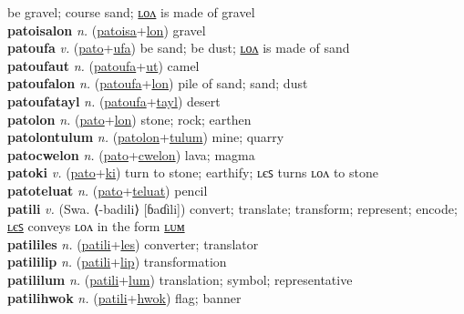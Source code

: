 be gravel; course sand; \hyperref[patoisalon]{ʟᴏᴧ} is made of gravel \label{patoisa} \\
\textbf{patoisalon} \textit{n.} (\hyperref[patoisa]{patoisa}+\hyperref[lon]{lon})
gravel \label{patoisalon} \\
\textbf{patoufa} \textit{v.} (\hyperref[pato]{pato}+\hyperref[ufa]{ufa})
be sand; be dust; \hyperref[patoufalon]{ʟᴏᴧ} is made of sand \label{patoufa} \\
\textbf{patoufaut} \textit{n.} (\hyperref[patoufa]{patoufa}+\hyperref[ut]{ut})
camel \label{patoufaut} \\
\textbf{patoufalon} \textit{n.} (\hyperref[patoufa]{patoufa}+\hyperref[lon]{lon})
pile of sand; sand; dust \label{patoufalon} \\
\textbf{patoufatayl} \textit{n.} (\hyperref[patoufa]{patoufa}+\hyperref[tayl]{tayl})
desert \label{patoufatayl} \\
\textbf{patolon} \textit{n.} (\hyperref[pato]{pato}+\hyperref[lon]{lon})
stone; rock; earthen \label{patolon} \\
\textbf{patolontulum} \textit{n.} (\hyperref[patolon]{patolon}+\hyperref[tulum]{tulum})
mine; quarry \label{patolontulum} \\
\textbf{patocwelon} \textit{n.} (\hyperref[pato]{pato}+\hyperref[cwelon]{cwelon})
lava; magma \label{patocwelon} \\
\textbf{patoki} \textit{v.} (\hyperref[pato]{pato}+\hyperref[ki]{ki})
turn to stone; earthify; ʟєꜱ turns ʟᴏᴧ to stone \label{patoki} \\
\textbf{patoteluat} \textit{n.} (\hyperref[pato]{pato}+\hyperref[teluat]{teluat})
pencil \label{patoteluat} \\
\textbf{patili} \textit{v.} (Swa. ⟨-badili⟩ [ɓaɗili])
convert; translate; transform; represent; encode; \hyperref[patililes]{ʟєꜱ} conveys ʟᴏᴧ in the form \hyperref[patililum]{ʟᴜᴍ} \label{patili} \\
\textbf{patililes} \textit{n.} (\hyperref[patili]{patili}+\hyperref[les]{les})
converter; translator \label{patililes} \\
\textbf{patililip} \textit{n.} (\hyperref[patili]{patili}+\hyperref[lip]{lip})
transformation \label{patililip} \\
\textbf{patililum} \textit{n.} (\hyperref[patili]{patili}+\hyperref[lum]{lum})
translation; symbol; representative \label{patililum} \\
\textbf{patilihwok} \textit{n.} (\hyperref[patili]{patili}+\hyperref[hwok]{hwok})
flag; banner \label{patilihwok} \\
